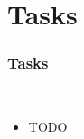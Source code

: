 \section{Tasks}

\begin{frame}
  \frametitle{Tasks}
  \begin{description}[]
	 \item[TODO] \hfill \\
	 \begin{itemize}
   	\item TODO
    \end{itemize}
  \end{description}
\end{frame}